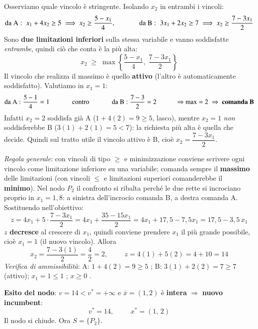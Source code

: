 \documentclass[12pt]{extarticle} %
\begin{document}
\noindent Osserviamo quale vincolo è stringente. Isolando $x_2$ in entrambi i vincoli:
\[
\text{da A}:\; x_1 + 4x_2 \ge 5 \;\Longrightarrow\; x_2 \ge \frac{5 - x_1}{4},
\hspace{1.2cm}
\text{da B}:\; 3x_1 + 2x_2 \ge 7 \;\Longrightarrow\; x_2 \ge \frac{7 - 3x_1}{2}
\]
Sono \textbf{due limitazioni inferiori} sulla stessa variabile e vanno soddisfatte \emph{entrambe}, quindi ciò che conta è la più alta:
\[
x_2 \;\ge\; \max\left\{\frac{5-x_1}{4},\;\frac{7-3x_1}{2}\right\}
\]
Il vincolo che realizza il massimo è quello \textbf{attivo} (l'altro è automaticamente soddisfatto). Valutiamo in $x_1 = 1$:
\[
\text{da A}: \frac{5-1}{4} = 1 \hspace{1.2cm}\text{contro}\hspace{1.2cm} \text{da B}: \frac{7-3}{2} = 2
\hspace{1cm} \Rightarrow \max = 2 \;\Rightarrow\; \textbf{comanda B}
\]
Infatti $x_2 = 2$ soddisfa già A ($1 + 4(2) = 9 \ge 5$, lasco), mentre $x_2 = 1$ \emph{non} soddisferebbe B ($3(1)+2(1) = 5 < 7$): la richiesta più alta è quella che decide. Quindi sul tratto utile il vincolo attivo è B, cioè $x_2 = \dfrac{7-3x_1}{2}$.

\medskip
\noindent\textit{Regola generale}: con vincoli di tipo $\ge$ e minimizzazione conviene scrivere ogni vincolo come limitazione inferiore su una variabile; comanda sempre il \textbf{massimo} delle limitazioni (con vincoli $\le$ e limitazioni superiori comanderebbe il \textbf{minimo}). Nel nodo $P_2$ il confronto si ribalta perché le due rette si incrociano proprio in $x_1 = 1{,}8$: a sinistra dell'incrocio comanda B, a destra comanda A. Sostituendo nell'obiettivo:
\[
z = 4x_1 + 5\cdot\frac{7 - 3x_1}{2} = 4x_1 + \frac{35 - 15x_1}{2} = 4x_1 + 17{,}5 - 7{,}5x_1 = 17{,}5 - 3{,}5\,x_1
\]
$z$ \textbf{decresce} al crescere di $x_1$, quindi conviene prendere $x_1$ il più grande possibile, cioè $x_1 = 1$ (il nuovo vincolo). Allora
\[
x_2 = \frac{7 - 3(1)}{2} = \frac{4}{2} = 2, \hspace{1cm} z = 4(1) + 5(2) = 4 + 10 = 14
\]
\textit{Verifica di ammissibilità}: A: $1 + 4(2) = 9 \ge 5$ \checkmark; B: $3(1) + 2(2) = 7 \ge 7$ \checkmark (attivo); $x_1 = 1 \le 1$ \checkmark; $x \ge 0$ \checkmark.

\textbf{Esito del nodo}: $v = 14 < v^* = +\infty$ e $\bar{x} = (1,2)$ è \textbf{intera} $\Rightarrow$ \textbf{nuovo incumbent}:
\[
v^* = 14, \hspace{1cm} x^* = (1,\,2)
\]
Il nodo si chiude. Ora $S = \{P_2\}$.
\end{document}
